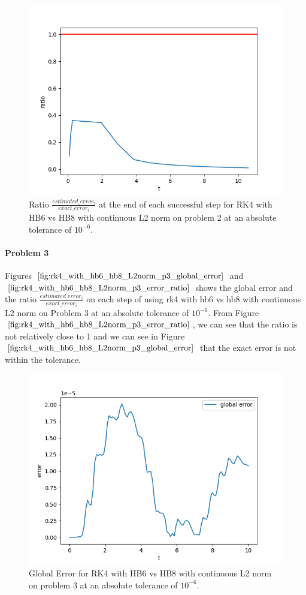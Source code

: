 \begin{figure}[H]
\centering
\includegraphics[width=0.7\linewidth]{./figures/rk4_with_hb6_hb8_L2norm_p2_error_ratio}
\caption{Ratio $\frac{estimated\_error_i}{exact\_error_i}$ at the end of each successful step for RK4 with HB6 vs HB8 with continuous L2 norm on problem 2 at an absolute tolerance of $10^{-6}$.}
\label{fig:rk4_with_hb6_hb8_L2norm_p2_error_ratio}
\end{figure}

\paragraph{Problem 3} Figures $\ref{fig:rk4_with_hb6_hb8_L2norm_p3_global_error}$ and $\ref{fig:rk4_with_hb6_hb8_L2norm_p3_error_ratio}$ shows the global error and the ratio $\frac{estimated\_error_i}{exact\_error_i}$ on each step of using rk4 with hb6 vs hb8 with continuous L2 norm on Problem 3 at an absolute tolerance of $10^{-6}$. From Figure $\ref{fig:rk4_with_hb6_hb8_L2norm_p3_error_ratio}$, we can see that the ratio is not relatively close to 1 and we can see in Figure $\ref{fig:rk4_with_hb6_hb8_L2norm_p3_global_error}$ that the exact error is not within the tolerance.


\begin{figure}[H]
\centering
\includegraphics[width=0.7\linewidth]{./figures/rk4_with_hb6_hb8_L2norm_p3_global_error}
\caption{Global Error for RK4 with HB6 vs HB8 with continuous L2 norm on problem 3 at an absolute tolerance of $10^{-6}$.}
\label{fig:rk4_with_hb6_hb8_L2norm_p3_global_error}
\end{figure}

